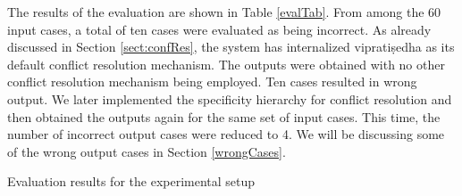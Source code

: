 \documentclass[a4paper,11pt,twoside,openright]{report}
\begin{document}
The results of the evaluation are shown in Table \ref{evalTab}. From among the 60 input cases, a total of ten cases were evaluated as being incorrect. As already discussed in Section \ref{sect:confRes}, the system has internalized vipratiṣedha as its default conflict resolution mechanism. The outputs were obtained with no other conflict resolution mechanism being employed. Ten cases resulted in wrong output. We later implemented the specificity hierarchy  for conflict resolution and then obtained the outputs again for the same set of input cases. This time, the number of incorrect output cases were reduced to 4. We will be discussing some of the wrong output cases in Section \ref{wrongCases}.  

\begin{table}[h]
\caption{Evaluation results for the experimental setup}
\label{evalTab}

\end{table}
\end{document}
